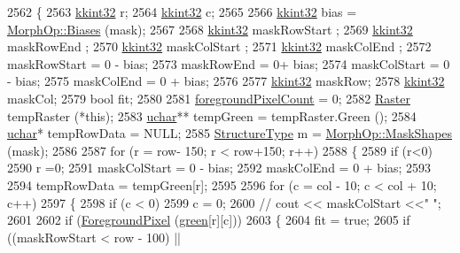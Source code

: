 \begin{DoxyCode}
2562 \{
2563   \hyperlink{namespace_k_k_b_a8fa4952cc84fda1de4bec1fbdd8d5b1b}{kkint32}  r;
2564   \hyperlink{namespace_k_k_b_a8fa4952cc84fda1de4bec1fbdd8d5b1b}{kkint32}  c;
2565 
2566   \hyperlink{namespace_k_k_b_a8fa4952cc84fda1de4bec1fbdd8d5b1b}{kkint32}  bias = \hyperlink{class_k_k_b_1_1_morph_op_affa9101a819e7103df69c8851cd7e920}{MorphOp::Biases} (mask);
2567 
2568   \hyperlink{namespace_k_k_b_a8fa4952cc84fda1de4bec1fbdd8d5b1b}{kkint32}  maskRowStart ;
2569   \hyperlink{namespace_k_k_b_a8fa4952cc84fda1de4bec1fbdd8d5b1b}{kkint32}  maskRowEnd  ; 
2570   \hyperlink{namespace_k_k_b_a8fa4952cc84fda1de4bec1fbdd8d5b1b}{kkint32}  maskColStart ;
2571   \hyperlink{namespace_k_k_b_a8fa4952cc84fda1de4bec1fbdd8d5b1b}{kkint32}  maskColEnd  ;
2572   maskRowStart = 0 - bias;
2573   maskRowEnd   = 0+ bias;
2574   maskColStart = 0 - bias;
2575   maskColEnd   = 0 + bias;
2576   
2577   \hyperlink{namespace_k_k_b_a8fa4952cc84fda1de4bec1fbdd8d5b1b}{kkint32}  maskRow;
2578   \hyperlink{namespace_k_k_b_a8fa4952cc84fda1de4bec1fbdd8d5b1b}{kkint32}  maskCol;
2579   \textcolor{keywordtype}{bool}  fit;
2580 
2581   \hyperlink{class_k_k_b_1_1_raster_aa7e86253f4b9c347da718732e44b60e8}{foregroundPixelCount} = 0;
2582   \hyperlink{class_k_k_b_1_1_raster}{Raster}      tempRaster (*\textcolor{keyword}{this});
2583   \hyperlink{namespace_k_k_b_ace9969169bf514f9ee6185186949cdf7}{uchar}**     tempGreen = tempRaster.Green ();
2584   \hyperlink{namespace_k_k_b_ace9969169bf514f9ee6185186949cdf7}{uchar}*      tempRowData = NULL;
2585   \hyperlink{class_k_k_b_1_1_morph_op_a09e4aff7e81327849855ff72082d85b3}{StructureType}  m = \hyperlink{class_k_k_b_1_1_morph_op_a7e477ebbb2c0cdd67388cb841685c02b}{MorphOp::MaskShapes} (mask);
2586 
2587   \textcolor{keywordflow}{for}  (r = row- 150;  r < row+150;  r++)
2588   \{ 
2589     \textcolor{keywordflow}{if} (r<0)
2590     r =0;
2591     maskColStart = 0 - bias;
2592     maskColEnd   = 0 + bias;
2593     
2594     tempRowData = tempGreen[r];
2595 
2596     \textcolor{keywordflow}{for}  (c = col - 10; c < col + 10; c++)
2597     \{
2598       \textcolor{keywordflow}{if}  (c < 0)
2599         c = 0;
2600       \textcolor{comment}{// cout << maskColStart <<" ";}
2601         
2602       \textcolor{keywordflow}{if}  (\hyperlink{class_k_k_b_1_1_raster_aa1e1363589e719eb64f0957281b84b6a}{ForegroundPixel} (\hyperlink{class_k_k_b_1_1_raster_a2d2238911145488e226cd2e34fc8448c}{green}[r][c]))
2603       \{
2604         fit = \textcolor{keyword}{true};
2605         \textcolor{keywordflow}{if}  ((maskRowStart <  row - 100)  || 

\end{DoxyCode}

